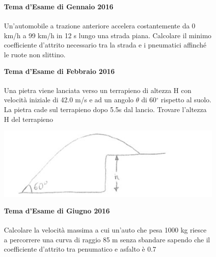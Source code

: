 
\begin{figure}[h!]
\textbf{Tema d'Esame di Gennaio 2016}\\ \\
Un’automobile a trazione anteriore accelera costantemente da 0 km/h a 99 km/h in 12 s
lungo una strada piana. Calcolare il minimo coefficiente d’attrito necessario tra la strada e i
pneumatici affinché le ruote non slittino.
\end{figure}


\begin{figure}[h!]
\textbf{Tema d'Esame di Febbraio 2016}\\ \\
Una pietra viene lanciata verso un terrapieno di altezza H con velocità iniziale di 42.0 m/s e ad un angolo $\theta$ di 60$^{\circ}$ rispetto al suolo. La pietra cade sul terrapieno dopo 5.5s dal lancio. Trovare l'altezza H del terrapieno
\\
	\begin{center}
		\includegraphics[scale=0.8]{ES1/FEB012016.jpg}
	\end{center}
	\noindent{}
   
   
\end{figure}


\begin{figure}[h!]
\textbf{Tema d'Esame di Giugno 2016}\\ \\
Calcolare la velocità massima a cui un'auto che pesa 1000 kg riesce a percorrere una curva di raggio 85 m senza sbandare sapendo che il coefficiente d'attrito tra penumatico e asfalto è 0.7
\end{figure}


